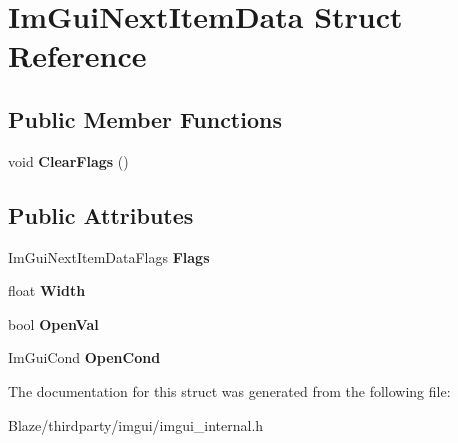 \hypertarget{structImGuiNextItemData}{}\section{Im\+Gui\+Next\+Item\+Data Struct Reference}
\label{structImGuiNextItemData}
\subsection*{Public Member Functions}
\begin{DoxyCompactItemize}
\item 
\mbox{\label{structImGuiNextItemData_a0159fd0bdffe71c29271a3dbdde9013b}} 
void {\bfseries Clear\+Flags} ()
\end{DoxyCompactItemize}
\subsection*{Public Attributes}
\begin{DoxyCompactItemize}
\item 
\mbox{\label{structImGuiNextItemData_aa05b7c79d02ab92ff23038cede65265b}} 
Im\+Gui\+Next\+Item\+Data\+Flags {\bfseries Flags}
\item 
\mbox{\label{structImGuiNextItemData_ab4e2f2f28801cc1d449ccaa105168938}} 
float {\bfseries Width}
\item 
\mbox{\label{structImGuiNextItemData_a72e212148815fefe93e7a7723d5db97b}} 
bool {\bfseries Open\+Val}
\item 
\mbox{\label{structImGuiNextItemData_ac9550c80e18abf14a4dffdca9211d719}} 
Im\+Gui\+Cond {\bfseries Open\+Cond}
\end{DoxyCompactItemize}


The documentation for this struct was generated from the following file\+:\begin{DoxyCompactItemize}
\item 
Blaze/thirdparty/imgui/imgui\+\_\+internal.\+h\end{DoxyCompactItemize}

